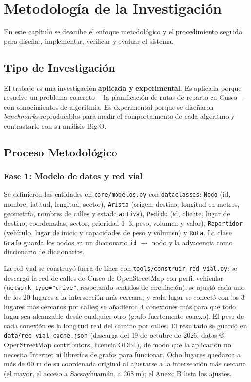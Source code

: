 \chapter{Metodología de la Investigación}

En este capítulo se describe el enfoque metodológico y el procedimiento seguido para diseñar, implementar, verificar y evaluar el sistema.

\section{Tipo de Investigación}

El trabajo es una investigación \textbf{aplicada y experimental}. Es aplicada porque resuelve un problema concreto ---la planificación de rutas de reparto en Cusco--- con conocimientos de algoritmia. Es experimental porque se diseñaron \textit{benchmarks} reproducibles para medir el comportamiento de cada algoritmo y contrastarlo con su análisis Big-O.

\section{Proceso Metodológico}

\subsection{Fase 1: Modelo de datos y red vial}

Se definieron las entidades en \texttt{core/modelos.py} con \texttt{dataclasses}: \texttt{Nodo} (id, nombre, latitud, longitud, sector), \texttt{Arista} (origen, destino, longitud en metros, geometría, nombres de calles y estado \texttt{activa}), \texttt{Pedido} (id, cliente, lugar de destino, coordenadas, sector, prioridad 1--3, peso, volumen y valor), \texttt{Repartidor} (vehículo, lugar de inicio y capacidades de peso y volumen) y \texttt{Ruta}. La clase \texttt{Grafo} guarda los nodos en un diccionario \texttt{id} $\to$ nodo y la adyacencia como diccionario de diccionarios.

La red vial se construyó fuera de línea con \texttt{tools/construir\_red\_vial.py}: se descargó la red de calles de Cusco de OpenStreetMap con perfil vehicular (\texttt{network\_type="drive"}, respetando sentidos de circulación), se ajustó cada uno de los 20 lugares a la intersección más cercana, y cada lugar se conectó con los 3 lugares más cercanos por calles; se añadieron 4 conexiones más para que todo lugar sea alcanzable desde cualquier otro (grafo fuertemente conexo). El peso de cada conexión es la longitud real del camino por calles. El resultado se guardó en \texttt{data/red\_vial\_cache.json} (descarga del 19 de octubre de 2026; datos © OpenStreetMap contributors, licencia ODbL), de modo que la aplicación no necesita Internet ni librerías de grafos para funcionar. Ocho lugares quedaron a más de 60 m de su coordenada original al ajustarse a la intersección más cercana (el mayor, el acceso a Sacsayhuamán, a 268 m); el Anexo B lista los ajustes.

